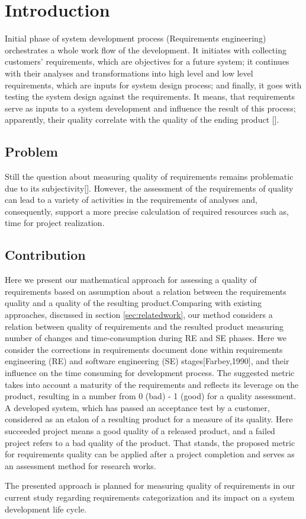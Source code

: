 \section{Introduction}
\label{sec:Intro} 
Initial phase of system development process (Requirements engineering) orchestrates a whole work flow of the development. 
It initiates with collecting customers' requirements, which are objectives for a future system; it continues with their  analyses 
and transformations into high level and low level requirements, which are inputs for system design process; 
and finally, it goes with testing the system design against the requirements. It means, that requirements serve as inputs to a system 
development and influence the result of this process; apparently, their quality correlate with the quality of the ending product [].

\subsection{Problem}
Still the question about measuring quality of requirements remains problematic due to its subjectivity[]. However, the assessment 
of the requirements of quality can lead to a variety of activities in the requirements of analyses and, consequently, support 
a more precise calculation of required resources such as, time for project realization.

\subsection{Contribution}
Here we present our mathematical approach for assessing a quality of requirements based on assumption about 
a relation between the requirements quality and a quality of the resulting product.Comparing with existing approaches, 
discussed in section \autoref{sec:relatedwork}, our method considers a relation between quality of requirements and 
the resulted product measuring number of changes and time-consumption during RE and SE phases. Here we consider 
the corrections in requirements document done within requirements engineering (RE) and software engineering (SE) stages[Farbey,1990], 
and their influence on the time consuming for development process. The suggested metric takes into account a maturity of the requirements 
and reflects its leverage on the product, resulting in a number from 0 (bad) - 1 (good) for a quality assessment. A developed system, 
which has passed an acceptance test by a customer, considered as an etalon of a resulting product for a measure of its quality. 
Here succeeded project means a good quality of a released product, and a failed project refers to a bad quality of the product. 
That stands, the proposed metric for requirements quality can be applied after a project completion and serves as an assessment method 
for research works. 

The presented approach is planned for measuring quality of requirements in our current study regarding requirements 
categorization and its impact on a system development life cycle.
